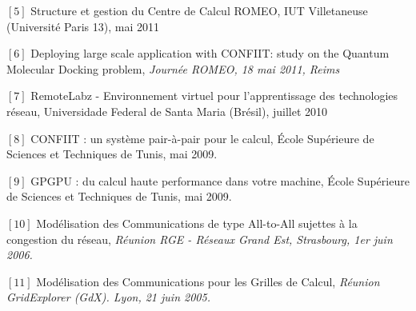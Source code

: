 \documentclass[final,twoside]{hdr} %
\begin{document}
\vspace{1em} \noindent $[5]$ {Structure et gestion du Centre de Calcul ROMEO}, IUT Villetaneuse (Université Paris 13), mai 2011

\vspace{1em} \noindent $[6]$ {Deploying large scale application with CONFIIT: study on the Quantum Molecular Docking problem}, \em{Journée ROMEO}, 18 mai 2011, Reims

\vspace{1em} \noindent $[7]$ {RemoteLabz - Environnement virtuel pour l’apprentissage des technologies réseau}, Universidade Federal de Santa Maria (Brésil), juillet 2010

\vspace{1em} \noindent $[8]$ {CONFIIT : un système pair-à-pair pour le calcul},  École Supérieure de Sciences et Techniques de Tunis, mai 2009.

\vspace{1em} \noindent $[9]$ {GPGPU : du calcul haute performance dans votre machine},  École Supérieure de Sciences et Techniques de Tunis, mai 2009.

\vspace{1em} \noindent $[10]$ {Modélisation des Communications de type All-to-All sujettes à la congestion du réseau}, \em{Réunion RGE - Réseaux Grand Est}, Strasbourg, 1er juin 2006.

\vspace{1em} \noindent $[11]$ {Modélisation des Communications pour les Grilles de Calcul}, \em{Réunion GridExplorer (GdX)}. Lyon, 21 juin 2005.




\end{document}
